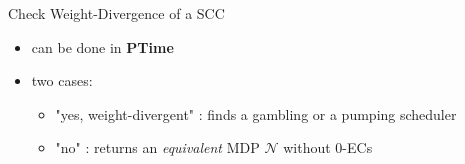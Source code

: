 \documentclass[onlymath]{beamer}
\begin{document}
\begin{frame}
\begin{block}{Check Weight-Divergence of a SCC}
	\begin{itemize}
		\item can be done in \textbf{PTime} \pause
		\item two cases:
		\begin{itemize}
			\item "yes, weight-divergent" : finds a gambling or a pumping scheduler \pause
			\item "no" : returns an \textit{equivalent} MDP $\mathcal{N}$ without 0-ECs 
		\end{itemize}
	\end{itemize}
\end{block}
\end{frame}
\end{document}
